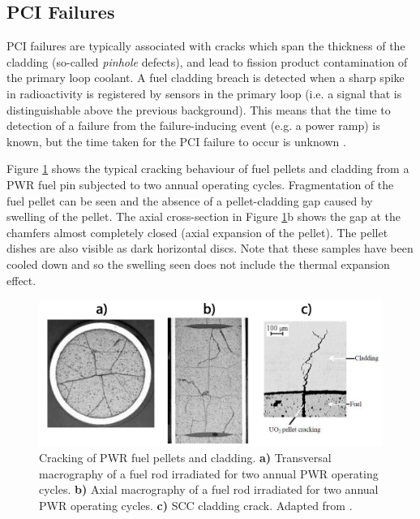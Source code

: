 \subsection{PCI Failures}

PCI failures are typically associated with cracks which span the thickness of the cladding (so-called \emph{pinhole} defects), and lead to fission product contamination of the primary loop coolant. A fuel cladding breach is detected when a sharp spike in radioactivity is registered by sensors in the primary loop (i.e. a signal that is distinguishable above the previous background). This means that the time to detection of a failure from the failure-inducing event (e.g. a power ramp) is known, but the time taken for the PCI failure to occur is unknown \cite{bcoxpelletclad1990}. 

Figure \ref{figure:fuelcladdingcrack} shows the typical cracking behaviour of fuel pellets and cladding from a PWR fuel pin subjected to two annual operating cycles. Fragmentation of the fuel pellet can be seen and the absence of a pellet-cladding gap caused by swelling of the pellet. The axial cross-section in Figure \ref{figure:fuelcladdingcrack}b shows the gap at the chamfers almost completely closed (axial expansion of the pellet). The pellet dishes are also visible as dark horizontal discs. Note that these samples have been cooled down and so the swelling seen does not include the thermal expansion effect. 

\begin{figure}[ht] %
\centering
\includegraphics[width=\linewidth]{images/fuelcladdingcrack.png}
\caption[Cracking of PWR fuel pellets and cladding. \textbf{a)} Transversal macrography of a fuel rod irradiated for two annual PWR operating cycles. \textbf{b)} Axial macrography of a fuel rod irradiated for two annual PWR operating cycles. \textbf{c)} SCC cladding failure.]{Cracking of PWR fuel pellets and cladding. \textbf{a)} Transversal macrography of a fuel rod irradiated for two annual PWR operating cycles. \textbf{b)} Axial macrography of a fuel rod irradiated for two annual PWR operating cycles. \textbf{c)} SCC cladding crack. Adapted from \cite{brochard2001modelling}.}
\label{figure:fuelcladdingcrack}
\end{figure}

